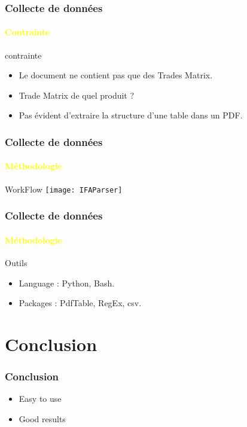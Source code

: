 \documentclass{beamer}
\begin{document}
\begin{frame}
  \frametitle{Collecte de données}
  \framesubtitle{\textbf{\textcolor{yellow}{Contrainte}}}
  \begin{block}{contrainte}
  	\begin{itemize}
    		\item Le document ne contient pas que des Trades Matrix.
    		\item Trade Matrix de quel produit ?
    		\item Pas évident d'extraire la structure d'une table dans un PDF.
  	\end{itemize}
  \end{block}
\end{frame}

\begin{frame}
  \frametitle{Collecte de données}
  \framesubtitle{\textbf{\textcolor{yellow}{Méthodologie}}}
	\begin{block}{WorkFlow}
    		\texttt{[image: IFAParser]}
	\end{block}
\end{frame}


\begin{frame}
  \frametitle{Collecte de données}
  \framesubtitle{\textbf{\textcolor{yellow}{Méthodologie}}}

  \begin{block}{Outils}
  	\begin{itemize}
    		\item Language : Python, Bash.
    		\item Packages : PdfTable, RegEx, csv.
  	\end{itemize}
  \end{block}
 \end{frame}

\section{Conclusion}

\begin{frame}
  \frametitle{Conclusion}

  \begin{itemize}
    \item Easy to use
    \item Good results
  \end{itemize}
\end{frame}
\end{document}
